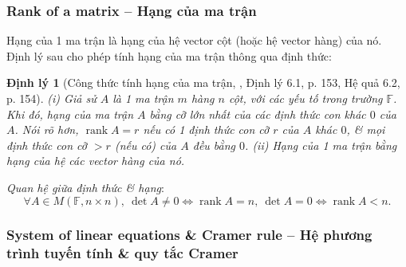 \documentclass{article}
\newtheorem{dinhly}{Định lý}
\begin{document}
\subsubsection{Rank of a matrix -- Hạng của ma trận}
Hạng của 1 ma trận là hạng của hệ vector cột (hoặc hệ vector hàng) của nó. Định lý sau cho phép tính hạng của ma trận thông qua định thức:

\begin{dinhly}[Công thức tính hạng của ma trận, \cite{Hung_linear_algebra}, Định lý 6.1, p. 153, Hệ quả 6.2, p. 154]
	(i) Giả sử $A$ là 1 ma trận $m$ hàng $n$ cột, với các yếu tố trong trường $\mathbb{F}$. Khi đó, hạng của ma trận $A$ bằng cỡ lớn nhất của các định thức con khác $0$ của $A$. Nói rõ hơn, $\operatorname{rank}A = r$ nếu có 1 định thức con cỡ $r$ của $A$ khác $0$, \& mọi định thức con cỡ $> r$ (nếu có) của $A$ đều bằng $0$. (ii) Hạng của 1 ma trận bằng hạng của hệ các vector hàng của nó.
\end{dinhly}
{\it Quan hệ giữa định thức \& hạng}:
\begin{equation*}
	\forall A\in M(\mathbb{F},n\times n),\ \det A\ne0\Leftrightarrow\operatorname{rank}A = n,\ \det A = 0\Leftrightarrow\operatorname{rank}A < n.
\end{equation*}

\subsubsection{System of linear equations \& Cramer rule -- Hệ phương trình tuyến tính \& quy tắc Cramer}
\end{document}
